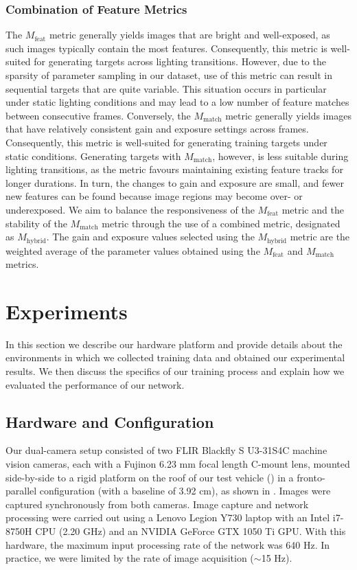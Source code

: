 \documentclass[letterpaper, 10pt, journal, twoside]{IEEEtran}
\begin{document}
\subsubsection{Combination of Feature Metrics}
The $M_{\text{feat}}$ metric generally yields images that are bright and well-exposed, as such images typically contain the most features. 
Consequently, this metric is well-suited for generating targets across lighting transitions. 
However, due to the sparsity of parameter sampling in our dataset, use of this metric can result in sequential targets that are quite variable. This situation occurs in particular under static lighting conditions and may lead to a low number of feature matches between consecutive frames. Conversely, the $M_{\text{match}}$ metric generally yields images that have relatively consistent gain and exposure settings across frames. Consequently, this metric is well-suited for generating training targets under static conditions. 
Generating targets with $M_{\text{match}}$, however, is less suitable during lighting transitions, as the metric favours maintaining existing feature tracks for longer durations. In turn, the changes to gain and exposure are small, and fewer new features can be found because image regions may become over- or underexposed.
We aim to balance the responsiveness of the $M_{\text{feat}}$ metric and the stability of the $M_{\text{match}}$ metric through the use of a combined metric, designated as $M_{\text{hybrid}}$. The gain and exposure values selected using the $M_{\text{hybrid}}$ metric are the weighted average of the parameter values obtained using the $M_{\text{feat}}$ and $M_{\text{match}}$ metrics.

\section{Experiments}
\label{sec:experiments}
In this section we describe our hardware platform and provide details about the environments in which we collected training data and obtained our experimental results. We then discuss the specifics of our training process and explain how we evaluated the performance of our network.

\subsection{Hardware and Configuration}
\label{subsec:hardware}

Our dual-camera setup consisted of two FLIR Blackfly S U3-31S4C machine vision cameras, each with a Fujinon 6.23 mm focal length C-mount lens, mounted side-by-side to a rigid platform on the roof of our test vehicle () in a fronto-parallel configuration (with a baseline of 3.92 cm), as shown in .
Images were captured synchronously from both cameras.
Image capture and network processing were carried out using a Lenovo Legion Y730 laptop with an Intel i7-8750H CPU (2.20 GHz) and an NVIDIA GeForce GTX 1050 Ti GPU. With this hardware, the maximum input processing rate of the network was 640 Hz. In practice, we were limited by the rate of image acquisition ($\sim$15 Hz).
\end{document}
